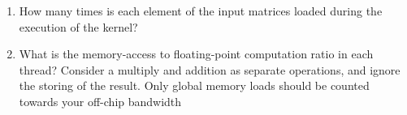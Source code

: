 \documentclass[12pt]{article}
\begin{document}
\begin{enumerate}

\item How many times is each element of the input matrices loaded during the execution of the kernel?


\item What is the memory-access to floating-point computation ratio in each thread?  Consider a multiply and addition as separate operations, and ignore the storing of the result.  Only global memory loads should be counted towards your off-chip bandwidth


\end{enumerate}
\end{document}
